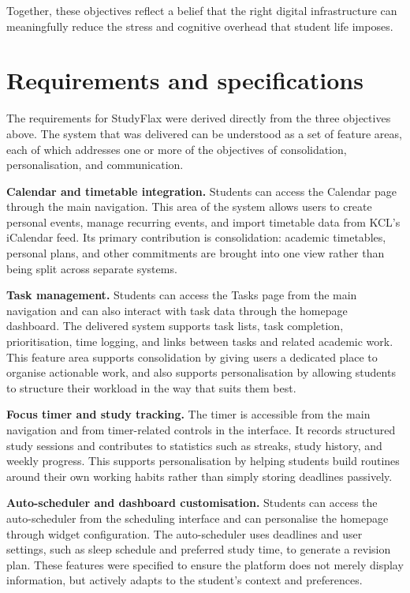 Together, these objectives reflect a belief that the right digital infrastructure can meaningfully reduce the stress and cognitive overhead that student life imposes.

\section{Requirements and specifications}
\label{sect:requirements}

The requirements for StudyFlax were derived directly from the three objectives above. The system that was delivered can be understood as a set of feature areas, each of which addresses one or more of the objectives of consolidation, personalisation, and communication.

\textbf{Calendar and timetable integration.} Students can access the Calendar page through the main navigation. This area of the system allows users to create personal events, manage recurring events, and import timetable data from KCL's iCalendar feed. Its primary contribution is consolidation: academic timetables, personal plans, and other commitments are brought into one view rather than being split across separate systems.

\textbf{Task management.} Students can access the Tasks page from the main navigation and can also interact with task data through the homepage dashboard. The delivered system supports task lists, task completion, prioritisation, time logging, and links between tasks and related academic work. This feature area supports consolidation by giving users a dedicated place to organise actionable work, and also supports personalisation by allowing students to structure their workload in the way that suits them best.

\textbf{Focus timer and study tracking.} The timer is accessible from the main navigation and from timer-related controls in the interface. It records structured study sessions and contributes to statistics such as streaks, study history, and weekly progress. This supports personalisation by helping students build routines around their own working habits rather than simply storing deadlines passively.

\textbf{Auto-scheduler and dashboard customisation.} Students can access the auto-scheduler from the scheduling interface and can personalise the homepage through widget configuration. The auto-scheduler uses deadlines and user settings, such as sleep schedule and preferred study time, to generate a revision plan. These features were specified to ensure the platform does not merely display information, but actively adapts to the student's context and preferences.


